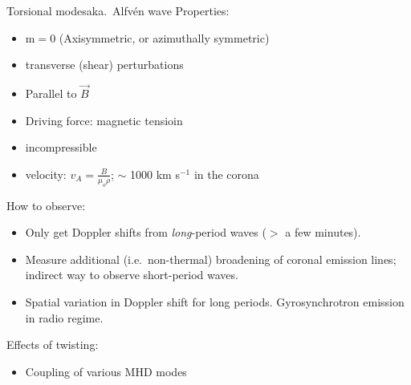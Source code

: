 \documentclass[table]{beamer}
\begin{document}
\begin{frame}{Torsional modes}{aka.\ Alfv\'en wave}
    Properties:
    \begin{itemize}
        \item m$=$0 (Axisymmetric, or azimuthally symmetric)
        \item transverse (shear) perturbations
        \item Parallel to $\vec{B}$
        \item Driving force: magnetic tensioin
        \item incompressible
        \item velocity: $v_{A} = \frac{B}{\mu_{o}\rho}$;
            $\sim$ 1000 km s$^{-1}$ in the corona
    \end{itemize}
    How to observe:
    \begin{itemize}
        \item Only get Doppler shifts from \emph{long}-period waves
            ($>$ a few minutes).
        \item Measure additional (i.e.\ non-thermal) broadening
            of coronal emission lines; indirect way to observe short-period waves.
        \item Spatial variation in Doppler shift for long periods.
            Gyrosynchrotron emission in radio regime.
    \end{itemize}
    Effects of twisting:
    \begin{itemize}
        \item Coupling of various MHD modes
    \end{itemize}
\end{frame}%
\end{document}
